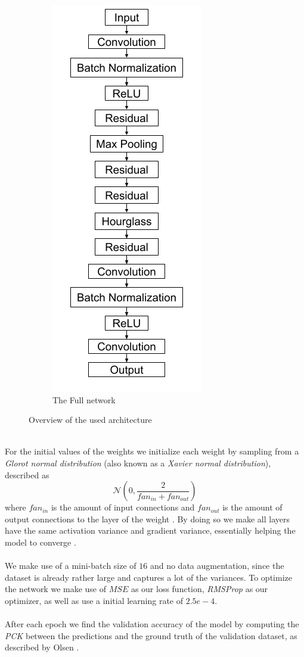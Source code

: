 \documentclass[./main.tex]{subfiles}
\begin{document}
\begin{figure}[p]
\begin{subfigure}{5 cm}
        \centering
        \includegraphics[width = 4 cm]{entities/SHG_drawing.png}
        \caption{The Full network}
    \end{subfigure}
    \caption{Overview of the used architecture}
    \label{fig:architecture}
\end{figure}
\\
For the initial values of the weights we initialize each weight by sampling from a \textit{Glorot normal distribution} (also known as a \textit{Xavier normal distribution}), described as
$$\mathcal{N} \left(0, \frac{2}{fan_{in} + fan_{out}} \right)$$
where $fan_{in}$ is the amount of input connections and $fan_{out}$ is the amount of output connections to the layer of the weight \cite{Xavier}. By doing so we make all layers have the same activation variance and gradient variance, essentially helping the model to converge \cite{DeepLearning}.
\\
\\
We make use of a mini-batch size of $16$ and no data augmentation, since the dataset is already rather large and captures a lot of the variances. To optimize the network we make use of $MSE$ as our loss function, \textit{RMSProp} as our optimizer, as well as use a initial learning rate of $2.5e-4$. 
\\
\\
After each epoch we find the validation accuracy of the model by computing the \textit{PCK} between the predictions and the ground truth of the validation dataset, as described by Olsen \cite{Camilla}.
\end{document}
